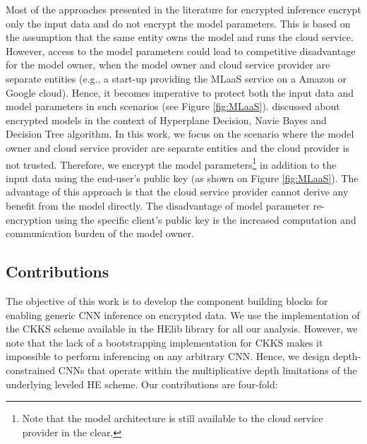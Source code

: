\documentclass[letterpaper]{article} %
\begin{document}
Most of the approaches presented in the literature for encrypted inference encrypt only the input data and do not encrypt the model parameters. This is based on the assumption that the same entity owns the model and runs the cloud service. However, access to the model parameters could lead to competitive disadvantage for the model owner, when the model owner and cloud service provider are separate entities (e.g., a start-up providing the MLaaS service on a Amazon or Google cloud). Hence, it becomes imperative to protect both the input data and model parameters in such scenarios (see Figure \ref{fig:MLaaS}). \cite{encryptedmodelinproceedings} discussed about encrypted models in the context of Hyperplane Decision, Navie Bayes and Decision Tree algorithm. In this work, we focus on the scenario where the model owner and cloud service provider are separate entities and the cloud provider is not trusted. Therefore, we encrypt the model parameters\footnote{Note that the model architecture is still available to the cloud service provider in the clear.} in addition to the input data using the end-user's public key (as shown on Figure \ref{fig:MLaaS}). The advantage of this approach is that the cloud service provider cannot derive any benefit from the model directly. The disadvantage of model parameter re-encryption using the specific client's public key is the increased computation and communication burden of the model owner.

\subsection{Contributions}
\label{subsec:Contributions}

The objective of this work is to develop the component building blocks for enabling generic CNN inference on encrypted data. We use the implementation of the CKKS scheme available in the HElib library \cite{helib} for all our analysis. However, we note that the lack of a bootstrapping implementation for CKKS makes it impossible to perform inferencing on any arbitrary CNN. Hence, we design depth-constrained CNNs that operate within the multiplicative depth limitations of the underlying leveled HE scheme. Our contributions are four-fold:
\end{document}
